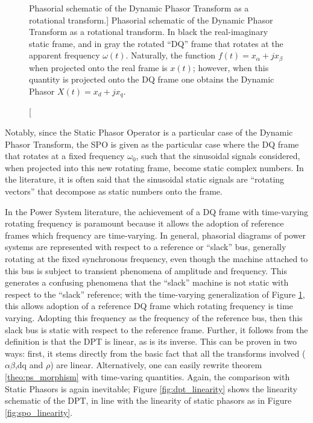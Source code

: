 \begin{figure}[htb!]
{
	}
	\caption
[Phasorial schematic of the Dynamic Phasor Transform as a rotational transform.]
{Phasorial schematic of the Dynamic Phasor Transform as a rotational transform. In black the real-imaginary static frame, and in gray the rotated ``DQ'' frame that rotates at the apparent frequency $\omega(t)$. Naturally, the function $f(t) = x_\alpha + jx_\beta$ when projected onto the real frame is $x(t)$; however, when this quantity is projected onto the DQ frame one obtains the Dynamic Phasor $X(t) = x_d + jx_q$.}
	\label{fig:dynamic_phasor_imreaxis}
\end{figure} %

	Notably, since the Static Phasor Operator is a particular case of the Dynamic Phasor Transform, the SPO is given as the particular case where the DQ frame that rotates at a fixed frequency $\omega_0$, such that the sinusoidal signals considered, when projected into this new rotating frame, become static complex numbers. In the literature, it is often said that the sinusoidal static signals are ``rotating vectors'' that decompose as static numbers onto the frame.

	In the Power System literature, the achievement of a DQ frame with time-varying rotating frequency is paramount because it allows the adoption of reference frames which frequency are time-varying. In general, phasorial diagrams of power systems are represented with respect to a reference or ``slack'' bus, generally rotating at the fixed synchronous frequency, even though the machine attached to this bus is subject to transient phenomena of amplitude and frequency. This generates a confusing phenomena that the ``slack'' machine is not static with respect to the ``slack'' reference; with the time-varying generalization of Figure \ref{fig:dynamic_phasor_imreaxis}, this allows adoption of a reference DQ frame which rotating frequency is time varying. Adopting this frequency as the frequency of the reference bus, then this slack bus is static with respect to the reference frame.
	Further, it follows from the definition is that the DPT is linear, as is its inverse. This can be proven in two ways: first, it stems directly from the basic fact that all the transforms involved ($\alpha\beta$,dq and $\rho$) are linear. Alternatively, one can easily rewrite theorem \ref{theo:ps_morphism} with time-varing quantities. Again, the comparison with Static Phasors is again inevitable; Figure \ref{fig:dpt_linearity} shows the linearity schematic of the DPT, in line with the linearity of static phasors as in Figure \ref{fig:spo_linearity}.

